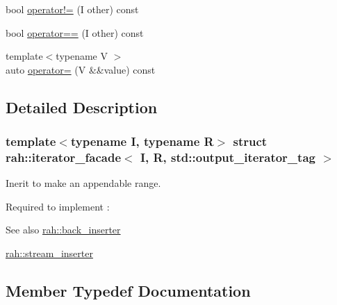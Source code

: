 \begin{DoxyCompactItemize}
\item 
bool \mbox{\hyperlink{structrah_1_1iterator__facade_3_01_i_00_01_r_00_01std_1_1output__iterator__tag_01_4_a3c3fc4b28b04fade22ea33a8c14f2771}{operator!=}} (I other) const
\item 
bool \mbox{\hyperlink{structrah_1_1iterator__facade_3_01_i_00_01_r_00_01std_1_1output__iterator__tag_01_4_a7ddab65a78bdd6b9fec8f4d122fbf731}{operator==}} (I other) const
\item 
{\footnotesize template$<$typename V $>$ }\\auto \mbox{\hyperlink{structrah_1_1iterator__facade_3_01_i_00_01_r_00_01std_1_1output__iterator__tag_01_4_aa5052339259412e552022ef533c31c67}{operator=}} (V \&\&value) const
\end{DoxyCompactItemize}


\subsection{Detailed Description}
\subsubsection*{template$<$typename I, typename R$>$\newline
struct rah\+::iterator\+\_\+facade$<$ I, R, std\+::output\+\_\+iterator\+\_\+tag $>$}

Inerit to make an appendable range. 

Required to implement \+: 
\begin{DoxyCode}{0}
\end{DoxyCode}
 \begin{DoxySeeAlso}{See also}
\mbox{\hyperlink{namespacerah_a0698f952bc3c4f1961929bbddb5812fe}{rah\+::back\+\_\+inserter}} 

\mbox{\hyperlink{namespacerah_a3f7b590b1bd8a44b5b2d6f4e35f1837c}{rah\+::stream\+\_\+inserter}} 
\end{DoxySeeAlso}


\subsection{Member Typedef Documentation}
\mbox{\label{structrah_1_1iterator__facade_3_01_i_00_01_r_00_01std_1_1output__iterator__tag_01_4_a98026d696f26da59a6b8a2bc85a4e8d1}} 
